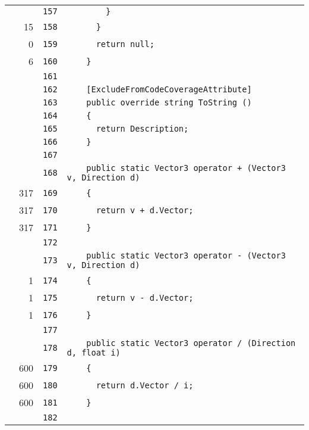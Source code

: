 \documentclass[a4paper,10pt]{article}
\begin{document}
\begin{longtable}[l]{lrrl}
\cellcolor{gray} &  & \verb~157~ & \verb~        }~\\
\cellcolor{green} & 15 & \verb~158~ & \verb~      }~\\
\cellcolor{red} & 0 & \verb~159~ & \verb~      return null;~\\
\cellcolor{green} & 6 & \verb~160~ & \verb~    }~\\
\cellcolor{gray} &  & \verb~161~ & \verb~~\\
\cellcolor{gray} &  & \verb~162~ & \verb~    [ExcludeFromCodeCoverageAttribute]~\\
\cellcolor{gray} &  & \verb~163~ & \verb~    public override string ToString ()~\\
\cellcolor{gray} &  & \verb~164~ & \verb~    {~\\
\cellcolor{gray} &  & \verb~165~ & \verb~      return Description;~\\
\cellcolor{gray} &  & \verb~166~ & \verb~    }~\\
\cellcolor{gray} &  & \verb~167~ & \verb~~\\
\cellcolor{gray} &  & \verb~168~ & \verb~    public static Vector3 operator + (Vector3 v, Direction d)~\\
\cellcolor{green} & 317 & \verb~169~ & \verb~    {~\\
\cellcolor{green} & 317 & \verb~170~ & \verb~      return v + d.Vector;~\\
\cellcolor{green} & 317 & \verb~171~ & \verb~    }~\\
\cellcolor{gray} &  & \verb~172~ & \verb~~\\
\cellcolor{gray} &  & \verb~173~ & \verb~    public static Vector3 operator - (Vector3 v, Direction d)~\\
\cellcolor{green} & 1 & \verb~174~ & \verb~    {~\\
\cellcolor{green} & 1 & \verb~175~ & \verb~      return v - d.Vector;~\\
\cellcolor{green} & 1 & \verb~176~ & \verb~    }~\\
\cellcolor{gray} &  & \verb~177~ & \verb~~\\
\cellcolor{gray} &  & \verb~178~ & \verb~    public static Vector3 operator / (Direction d, float i)~\\
\cellcolor{green} & 600 & \verb~179~ & \verb~    {~\\
\cellcolor{green} & 600 & \verb~180~ & \verb~      return d.Vector / i;~\\
\cellcolor{green} & 600 & \verb~181~ & \verb~    }~\\
\cellcolor{gray} &  & \verb~182~ & \verb~~\\

\end{longtable}
\end{document}

